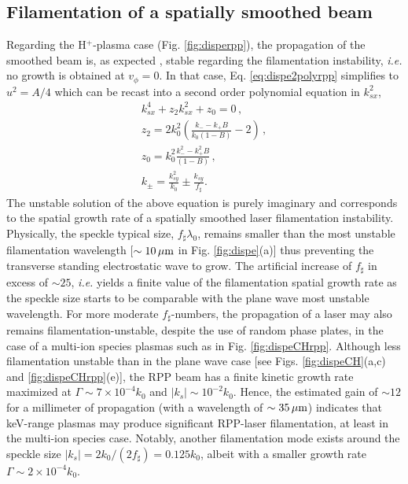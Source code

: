 \documentclass[
 reprint,
 superscriptaddress,
 amsmath,amssymb,
 aps,
]{revtex4-1}
\begin{document}
\subsection{Filamentation of a spatially smoothed beam}\label{sec:filam}
Regarding the H$^+$-plasma case (Fig. \ref{fig:disperpp}), the propagation of the smoothed beam is, as expected  \cite[]{NatPhys_Glenzer,POP_Berger_98b,PRL_Sarri_2011}, stable regarding the filamentation instability, \emph{i.e.} no growth is obtained  at $v_\phi=0$. In that case, Eq. \eqref{eq:dispe2polyrpp} simplifies to $u^2=A/4$ which can be recast into a second order polynomial equation in $k_{sx}^2$,
\begin{align}
    k_{sx}^4 + z_2 k_{sx}^2 +z_0=0 \, ,\nonumber \\
    z_2 = 2k_0^2\left(  \frac{k_- -k_+ B}{k_0(1-B)} -2  \right)\, , \nonumber\\
    z_0 = k_0^2\frac{k_-^2 -k_+^2 B}{(1-B)}\, ,\nonumber \\
    k_\pm =\frac{k_{sy}^2}{k_0}\pm\frac{k_{sy}}{f_\sharp} .\label{eq:dispefilam}
\end{align}
The unstable solution of the above equation is purely imaginary and corresponds to the spatial growth rate of a spatially smoothed laser filamentation instability.
Physically, the speckle typical size, $f_\sharp\lambda_0$, remains smaller than the most unstable filamentation wavelength [$\sim 10 \,\rm\mu m$ in Fig. \ref{fig:dispe}(a)] thus preventing the transverse standing electrostatic wave to grow. The artificial increase of $f_\sharp$ in excess of $\sim 25$, \emph{i.e.} yields a finite value of the filamentation spatial growth rate as the speckle size starts to be comparable with the plane wave most unstable wavelength. 
For more moderate  $f_\sharp$-numbers, the propagation of a laser may  also remains filamentation-unstable, despite the use of random phase plates,  in  the case of a multi-ion species plasmas such as in Fig.   \ref{fig:dispeCHrpp}. 
Although less filamentation unstable than in the plane wave case [see Figs. \ref{fig:dispeCH}(a,c) and \ref{fig:dispeCHrpp}(e)], the RPP beam has a finite kinetic growth rate maximized at  $\Gamma\sim 7\times 10^{-4}k_0 $  and $\vert k_s\vert \sim  10^{-2}k_0$. 
Hence, the estimated  gain of $\sim 12$   for a millimeter of propagation (with a wavelength of $\sim 35 \,\rm \mu m$) indicates that keV-range plasmas may produce significant RPP-laser filamentation, at least in the multi-ion species case.
Notably, another filamentation mode exists around the speckle size $\vert k_s\vert =2k_0/(2f_\sharp) = 0.125k_0$, albeit with a smaller growth rate $\Gamma\sim 2\times 10^{-4}k_0 $.
\end{document}
